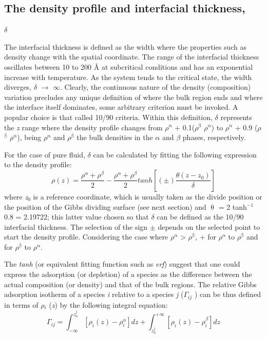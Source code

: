 \documentclass{scrbook}
\begin{document}
\subsection{The density profile and interfacial thickness,} {${\delta}$}

The interfacial thickness is defined as the width where the properties such as
density change with the spatial coordinate. The range of the interfacial
thickness oscillates between 10 to 200 \AA{} at subcritical conditions and has
an exponential increase with temperature. As the system tends to the critical
state, the width diverges, {${\delta}$} ${\rightarrow}$ ${\infty}$. Clearly,
the continuous nature of the density (composition) variation precludes any
unique definition of where the bulk region ends and where the interface itself
dominates, some arbitrary criterion must be invoked. A popular choice is that
called 10/90 criteria. Within this definition, {${\delta}$} represents the
\textit{z} range where the density profile changes from
${\rho}$$^{\mathrm{{\upalpha}}}$ + 0.1(${\rho}$$^{\mathrm{{\upbeta}}}$
\textendash{} ${\rho}$$^{\mathrm{{\upalpha}}}$) to
${\rho}$$^{\mathrm{{\upalpha}}}$ + 0.9 (${\rho}$$^{\mathrm{{\upbeta}}}$
\textendash{} ${\rho}$$^{\mathrm{{\upalpha}}}$), being
${\rho}$$^{\mathrm{{\upalpha}}}$ and ${\rho}$$^{\mathrm{{\upbeta}}}$ the bulk
densities in the {${\alpha}$} and {${\beta}$} phases, respectively.

For the case of pure fluid, {${\delta}$} can be calculated by fitting the following expression to the density profile\citep{evans1992}:
\begin{equation}
\rho\left(z\right)=\frac{\rho^{\alpha}+\rho^{\beta}}{2}-\frac{\rho^{\alpha}+\rho^{\beta}}{2}tanh\left[\left(\pm\right)\frac{\theta\left(z-z_{0}\right)}{\delta}\right]
\end{equation}
where \textit{z}$_{0}$ is a reference coordinate, which is usually taken as the
divide position or the position of the Gibbs dividing surface (see next
section) and {${\uptheta}$} = 2 tanh$^{-1}$ 0.8 = 2.19722; this latter value
chosen so that {${\delta}$} can be defined as the 10/90 interfacial thickness.
The selection of the sign ${\pm}$ depends on the selected point to start the
density profile. Considering the case where ${\rho}$$^{\mathrm{{\upalpha}}}$
{\textgreater} ${\rho}$$^{\mathrm{{\upbeta}}}$,  + for
${\rho}$$^{\mathrm{{\upalpha}}}$ to ${\rho}$$^{\mathrm{{\upbeta}}}$ and
\textendash{} for ${\rho}$$^{\mathrm{{\upbeta}}}$ to
${\rho}$$^{\mathrm{{\upalpha}}}$.

The \textit{tanh} (or equivalent fitting function such as \textit{erf}) suggest
that one could express the adsorption (or depletion) of a species as the
difference between the actual composition (or density) and that of the bulk
regions. The relative Gibbs adsorption isotherm of a species \textit{i}
relative to a species \textit{j} (${\Gamma}$$_{ij}$ ) can be thus defined in
terms of ${\rho}$$_{i}$ (\textit{z}) by the following integral
equation\citep{evans1992}:
\begin{equation}
\varGamma_{ij}=\int_{-\infty}^{z_{0}^{j}}\left[\rho_{i}\left(z\right)-\rho{}_{i}^{\alpha}\right]dz+\int_{z_{0}^{j}}^{+\infty}\left[\rho_{i}\left(z\right)-\rho{}_{i}^{\beta}\right]dz
\end{equation}
\end{document}
